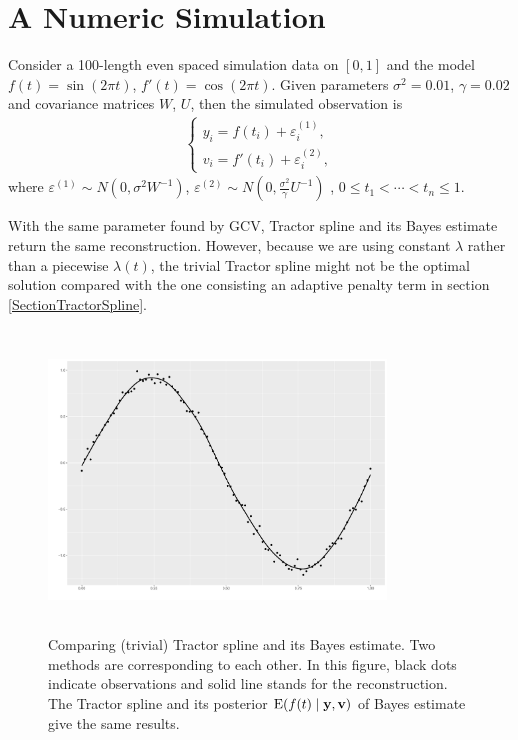 \section{A Numeric Simulation}

Consider a 100-length even spaced simulation data on $[0,1]$ and the model $f(t)=\sin(2\pi t)$, $f'(t)=\cos(2\pi t)$. Given parameters $\sigma^2=0.01$, $\gamma=0.02$ and covariance matrices $W$, $U$, then the simulated observation is 
\begin{align}
\begin{cases}
y_i =f(t_i)+\varepsilon_{i}^{(1)}, \\
v_i =f'(t_i)+\varepsilon_{i}^{(2)}, 
\end{cases}
\end{align}
where $\varepsilon^{(1)}\sim N(0,\sigma^2W^{-1})$, $\varepsilon^{(2)}\sim N(0,\frac{\sigma^2}{\gamma}U^{-1})$ , $0\leq t_1 < \cdots < t_n \leq 1$. 

With the same parameter found by GCV, Tractor spline and its Bayes estimate return the same reconstruction. However, because we are using constant $\lambda$ rather than a piecewise $\lambda(t)$, the trivial Tractor spline might not be the optimal solution compared with the one consisting an adaptive penalty term in section \ref{SectionTractorSpline}. 

\begin{figure}[h]
\centering
\includegraphics[width=0.8\textwidth,height=8cm]{Chapters/03GPR/plot/ggsim_cov} 
 \caption{Comparing (trivial) Tractor spline and its Bayes estimate. Two methods are corresponding to each other. In this figure, black dots indicate observations and solid line stands for the reconstruction. The Tractor spline and its posterior $\mathrm{E}(f(t) \mid \mathbf{y}, \mathbf{v})$ of Bayes estimate give the same results. }
\end{figure}




